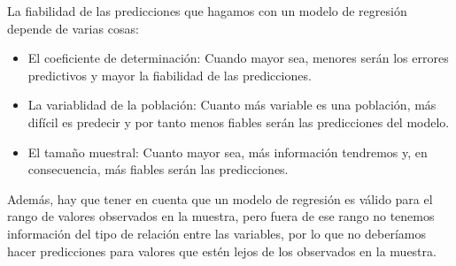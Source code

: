 La fiabilidad de las predicciones que hagamos con un modelo de regresión depende de varias cosas:
\begin{itemize}
\item El coeficiente de determinación: Cuando mayor sea, menores serán los errores predictivos y mayor la fiabilidad de las predicciones.
\item La variablidad de la población: Cuanto más variable es una población, más difícil es predecir y por tanto menos fiables serán las predicciones del modelo.
\item El tamaño muestral: Cuanto mayor sea, más información tendremos y, en consecuencia, más fiables serán las predicciones. 
\end{itemize} 

Además, hay que tener en cuenta que un modelo de regresión es válido para el
rango de valores observados en la muestra, pero fuera de ese rango no tenemos
información del tipo de relación entre las variables, por lo que no deberíamos
hacer predicciones para valores que estén lejos de los observados en la
muestra.


